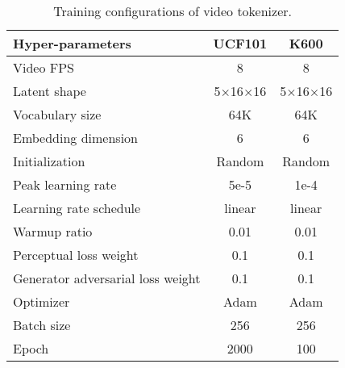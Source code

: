 \begin{table}[]
\caption{Training configurations of video tokenizer.}
\label{tab:tok_train_config}
\centering
\begin{tabular}{l|cc}
\toprule
Hyper-parameters                  & UCF101                          & K600                            \\ \midrule
Video  FPS              & 8 & 8 \\
Latent shape                      & 5$\times$16$\times$16           & 5$\times$16$\times$16           \\
Vocabulary size                   & 64K                           & 64K                           \\
Embedding dimension               & 6                               & 6                               \\
Initialization                    & Random                          & Random                          \\
Peak learning rate                & 5e-5                            & 1e-4                            \\
Learning rate schedule            & linear & linear              \\
Warmup ratio                      & 0.01                            & 0.01                            \\
Perceptual loss weight            & 0.1                             & 0.1                             \\
Generator adversarial loss weight & 0.1                             & 0.1                             \\
Optimizer                         & Adam                            & Adam                            \\
Batch size                        & 256                             & 256                             \\
Epoch                             & 2000                            & 100                             \\ \bottomrule
\end{tabular}
\end{table}